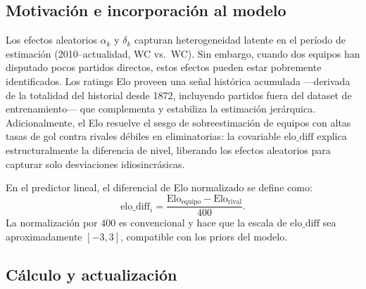 \documentclass[12pt,a4paper]{article}
\begin{document}
\subsection{Motivación e incorporación al modelo}

Los efectos aleatorios $\alpha_k$ y $\delta_k$ capturan heterogeneidad latente
en el período de estimación (2010--actualidad, WC vs.\ WC).
Sin embargo, cuando dos equipos han disputado pocos partidos directos, estos
efectos pueden estar pobremente identificados.
Los ratings Elo proveen una señal histórica acumulada —derivada de la totalidad
del historial desde 1872, incluyendo partidos fuera del dataset de entrenamiento—
que complementa y estabiliza la estimación jerárquica.
Adicionalmente, el Elo resuelve el sesgo de sobreestimación de equipos con
altas tasas de gol contra rivales débiles en eliminatorias: la covariable
$\text{elo\_diff}$ explica estructuralmente la diferencia de nivel, liberando
los efectos aleatorios para capturar solo desviaciones idiosincrásicas.

En el predictor lineal, el diferencial de Elo normalizado se define como:
\begin{equation}
  \text{elo\_diff}_i = \frac{\text{Elo}_{\text{equipo}} - \text{Elo}_{\text{rival}}}{400}.
  \label{eq:elo-diff}
\end{equation}
La normalización por 400 es convencional y hace que la escala de
$\text{elo\_diff}$ sea aproximadamente $[-3, 3]$, compatible con los priors del modelo.

\subsection{Cálculo y actualización}
\end{document}
